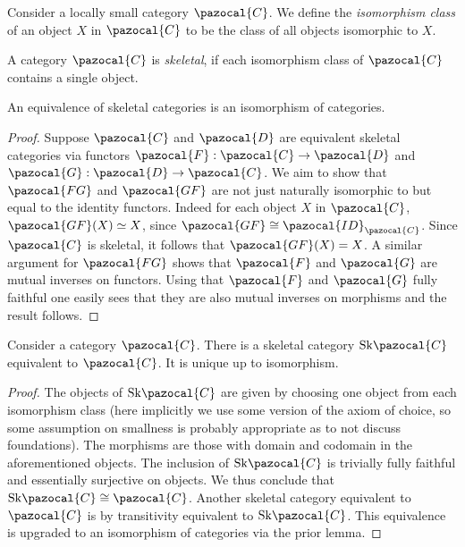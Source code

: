     \begin{definition}
        Consider a locally small category $\pazocal{C}$. We define the \emph{isomorphism class} of an object $X$ in $\pazocal{C}$ to be the class of all objects isomorphic to $X$.
    \end{definition}
    \begin{definition}
        A category $\pazocal{C}$ is \emph{skeletal}, if each isomorphism class of $\pazocal{C}$ contains a single object. 
    \end{definition}
    \begin{lemma}
        An equivalence of skeletal categories is an isomorphism of categories. 
    \end{lemma}
    \begin{proof}
        Suppose $\pazocal{C}$ and $\pazocal{D}$ are equivalent skeletal categories via functors $\pazocal{F}: \pazocal{C}\rightarrow \pazocal{D}$ and $\pazocal{G}:\pazocal{D}\rightarrow \pazocal{C}$. We aim to show that $\pazocal{FG}$ and $\pazocal{GF}$ are not just naturally isomorphic to but equal to the identity functors. Indeed for each object $X$ in $\pazocal{C}$, $\pazocal{GF}(X)\simeq X$, since $\pazocal{GF}\cong \pazocal{ID}_\pazocal{C}$. Since $\pazocal{C}$ is skeletal, it follows that $\pazocal{GF}(X)=X$. A similar argument for $\pazocal{FG}$ shows that $\pazocal{F}$ and $\pazocal{G}$ are mutual inverses on functors. Using that $\pazocal{F}$ and $\pazocal{G}$ fully faithful one easily sees that they are also mutual inverses on morphisms and the result follows.
    \end{proof}
    \begin{proposition}
        Consider a category $\pazocal{C}$. There is a skeletal category $\mathrm{Sk}\pazocal{C}$ equivalent to $\pazocal{C}$. It is unique up to isomorphism.   
    \end{proposition}
    \begin{proof}
        The objects of $\mathrm{Sk}\pazocal{C}$ are given by choosing one object from each isomorphism class (here implicitly we use some version of the axiom of choice, so some assumption on smallness is probably appropriate as to not discuss foundations). The morphisms are those with domain and codomain in the aforementioned objects. The inclusion of $\mathrm{Sk}\pazocal{C}$ is trivially fully faithful and essentially surjective on objects. We thus conclude that $\mathrm{Sk}\pazocal{C}\cong \pazocal{C}$. Another skeletal category equivalent to $\pazocal{C}$ is by transitivity equivalent to $\mathrm{Sk}\pazocal{C}$. This equivalence is upgraded to an isomorphism of categories via the prior lemma. 
    \end{proof}
    
